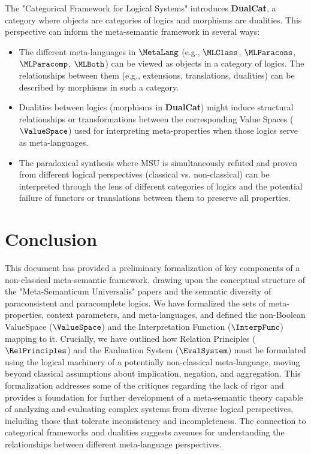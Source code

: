 																	The "Categorical Framework for Logical Systems" introduces \textbf{DualCat}, a category where objects are categories of logics and morphisms are dualities. This perspective can inform the meta-semantic framework in several ways:
																	
																	\begin{itemize}[wide, labelwidth=!, labelindent=0pt, before=\RaggedRight, after=\RaggedRight] %
																		\item The different meta-languages in $\MetaLang$ (e.g., $\MLClass$, $\MLParacons$, $\MLParacomp$, $\MLBoth$) can be viewed as objects in a category of logics. The relationships between them (e.g., extensions, translations, dualities) can be described by morphisms in such a category.
																		\item Dualities between logics (morphisms in \textbf{DualCat}) might induce structural relationships or transformations between the corresponding Value Spaces ($\ValueSpace$) used for interpreting meta-properties when those logics serve as meta-languages.
																		\item The paradoxical synthesis where MSU is simultaneously refuted and proven from different logical perspectives (classical vs. non-classical) can be interpreted through the lens of different categories of logics and the potential failure of functors or translations between them to preserve all properties.
																	\end{itemize}
																	
																	\section{Conclusion}
																	
																	\RaggedRight %
																	This document has provided a preliminary formalization of key components of a non-classical meta-semantic framework, drawing upon the conceptual structure of the "Meta-Semanticum Universalis" papers and the semantic diversity of paraconsistent and paracomplete logics. We have formalized the sets of meta-properties, context parameters, and meta-languages, and defined the non-Boolean ValueSpace ($\ValueSpace$) and the Interpretation Function ($\InterpFunc$) mapping to it. Crucially, we have outlined how Relation Principles ($\RelPrinciples$) and the Evaluation System ($\EvalSystem$) must be formulated using the logical machinery of a potentially non-classical meta-language, moving beyond classical assumptions about implication, negation, and aggregation. This formalization addresses some of the critiques regarding the lack of rigor and provides a foundation for further development of a meta-semantic theory capable of analyzing and evaluating complex systems from diverse logical perspectives, including those that tolerate inconsistency and incompleteness. The connection to categorical frameworks and dualities suggests avenues for understanding the relationships between different meta-language perspectives.
																	
